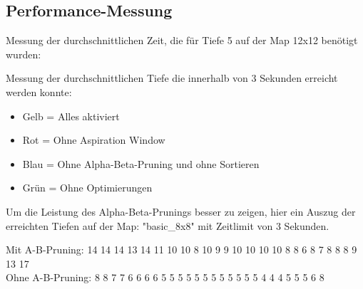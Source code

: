 \documentclass[12pt,a4paper,bibliography=totocnumbered,listof=totocnumbered]{scrartcl}
\begin{document}
\subsection{Performance-Messung}
Messung der durchschnittlichen Zeit, die für Tiefe 5 auf der Map 12x12 benötigt wurden:

\begin{bchart}[max = 105]
\end{bchart}

Messung der durchschnittlichen Tiefe die innerhalb von 3 Sekunden erreicht werden konnte:
\begin{itemize}
\item Gelb = Alles aktiviert
\item Rot = Ohne Aspiration Window
\item Blau = Ohne Alpha-Beta-Pruning und ohne Sortieren
\item Grün = Ohne Optimierungen
\end{itemize}

\begin{bchart}[max = 11]
\bigskip
{}
\bigskip
{}

\end{bchart}

\pagebreak
Um die Leistung des Alpha-Beta-Prunings besser zu zeigen, hier ein Auszug der erreichten Tiefen auf der Map:  "basic\_8x8" mit Zeitlimit von 3 Sekunden.
 
Mit A-B-Pruning:	14	14	14	13	14	11	10	10	8	10	9	9	10	10 	10 	10 	8	8	6	8	7	8	8	8	9	13	17  \\
Ohne A-B-Pruning:	 8	8	7	7	6	6	6	6	5	5	5	5	5	5	5	5	5	5	5	5	4	4	4	5	5	5	6	8 \\
\end{document}
